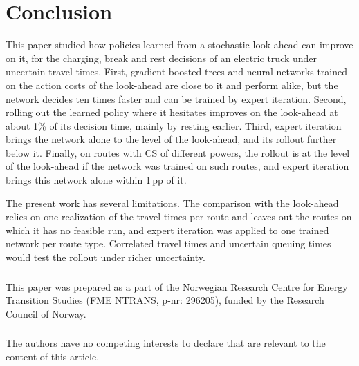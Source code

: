 \documentclass[runningheads]{llncs}
\begin{document}
\section{Conclusion}
\label{sec:conclusion}

This paper studied how policies learned from a stochastic look-ahead can
improve on it, for the charging, break and rest decisions of an electric truck
under uncertain travel times. First, gradient-boosted trees and neural
networks trained on the action costs of the look-ahead are close to it and
perform alike, but the network decides ten times faster and can be trained by
expert iteration. Second, rolling out the learned policy where it hesitates
improves on the look-ahead at about 1\% of its decision time, mainly by
resting earlier. Third, expert iteration brings the network alone to the level
of the look-ahead, and its rollout further below it. Finally, on routes with
CS of different powers, the rollout is at the level of the look-ahead if the
network was trained on such routes, and expert iteration brings this network
alone within 1\,pp of it.

The present work has several limitations. The comparison with the look-ahead
relies on one realization of the travel times per route and leaves out the
routes on which it has no feasible run, and expert iteration was applied to
one trained network per route type. Correlated travel times and
uncertain queuing times would test the rollout under richer uncertainty.

\begin{credits}
\subsubsection{\ackname}
This paper was prepared as a part of the Norwegian Research Centre for Energy
Transition Studies (FME NTRANS, p-nr: 296205), funded by the Research Council
of Norway.
\subsubsection{\discintname}
The authors have no competing interests to declare that are relevant to the
content of this article.
\end{credits}



\end{document}
